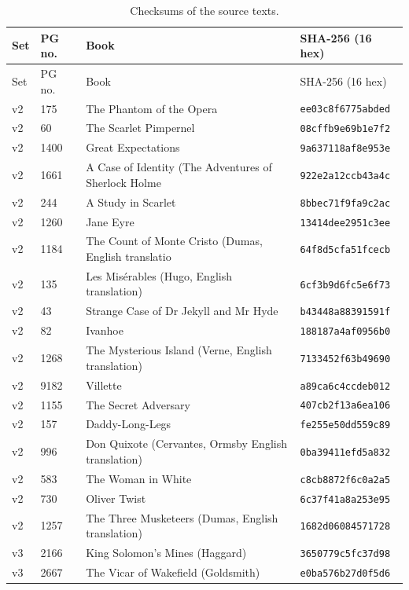 \documentclass[11pt]{article}
\begin{document}
{\scriptsize\begin{longtable}{p{0.9cm}p{1.0cm}p{8.4cm}p{3.2cm}}
\caption{Checksums of the source texts.}\label{tab:s-checksums}\\
\toprule Set & PG no. & Book & SHA-256 (16 hex) \\ \midrule \endfirsthead \toprule Set & PG no. & Book & SHA-256 (16 hex) \\ \midrule \endhead
v2 & 175 & The Phantom of the Opera & \texttt{ee03c8f6775abded} \\
v2 & 60 & The Scarlet Pimpernel & \texttt{08cffb9e69b1e7f2} \\
v2 & 1400 & Great Expectations & \texttt{9a637118af8e953e} \\
v2 & 1661 & A Case of Identity (The Adventures of Sherlock Holme & \texttt{922e2a12ccb43a4c} \\
v2 & 244 & A Study in Scarlet & \texttt{8bbec71f9fa9c2ac} \\
v2 & 1260 & Jane Eyre & \texttt{13414dee2951c3ee} \\
v2 & 1184 & The Count of Monte Cristo (Dumas, English translatio & \texttt{64f8d5cfa51fcecb} \\
v2 & 135 & Les Misérables (Hugo, English translation) & \texttt{6cf3b9d6fc5e6f73} \\
v2 & 43 & Strange Case of Dr Jekyll and Mr Hyde & \texttt{b43448a88391591f} \\
v2 & 82 & Ivanhoe & \texttt{188187a4af0956b0} \\
v2 & 1268 & The Mysterious Island (Verne, English translation) & \texttt{7133452f63b49690} \\
v2 & 9182 & Villette & \texttt{a89ca6c4ccdeb012} \\
v2 & 1155 & The Secret Adversary & \texttt{407cb2f13a6ea106} \\
v2 & 157 & Daddy-Long-Legs & \texttt{fe255e50dd559c89} \\
v2 & 996 & Don Quixote (Cervantes, Ormsby English translation) & \texttt{0ba39411efd5a832} \\
v2 & 583 & The Woman in White & \texttt{c8cb8872f6c0a2a5} \\
v2 & 730 & Oliver Twist & \texttt{6c37f41a8a253e95} \\
v2 & 1257 & The Three Musketeers (Dumas, English translation) & \texttt{1682d06084571728} \\
v3 & 2166 & King Solomon's Mines (Haggard) & \texttt{3650779c5fc37d98} \\
v3 & 2667 & The Vicar of Wakefield (Goldsmith) & \texttt{e0ba576b27d0f5d6} \\

\end{longtable}}
\end{document}
